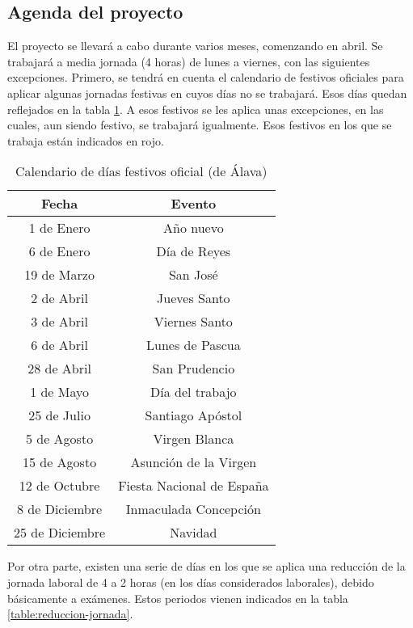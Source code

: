 \subsection{Agenda del proyecto}
El proyecto se llevará a cabo durante varios meses, comenzando en abril. Se trabajará a media jornada (4 horas) de lunes a viernes, con las siguientes excepciones. Primero, se tendrá en cuenta el calendario de festivos oficiales para aplicar algunas jornadas festivas en cuyos días no se trabajará. Esos días quedan reflejados en la tabla \ref{table:festivos-oficiales}. A esos festivos se les aplica unas excepciones, en las cuales, aun siendo festivo, se trabajará igualmente. Esos festivos en los que se trabaja están indicados en rojo.

\begin{table}[H]
	\centering
	\begin{tabular}{ |c|c| } 
		\hline
		Fecha & Evento \\
		\hline
		1 de Enero & Año nuevo \\
		6 de Enero & Día de Reyes \\
		19 de Marzo & San José \\
		{\color{red} 2 de Abril} & {\color{red} Jueves Santo }\\
		{\color{red} 3 de Abril} & {\color{red} Viernes Santo }\\
		{\color{red} 6 de Abril} & {\color{red} Lunes de Pascua }\\
		28 de Abril & San Prudencio \\
		1 de Mayo & Día del trabajo \\
		{\color{red}25 de Julio} & {\color{red}Santiago Apóstol } \\
		5 de Agosto & Virgen Blanca \\
		15 de Agosto & Asunción de la Virgen \\
		12 de Octubre & Fiesta Nacional de España \\
		8 de Diciembre & Inmaculada Concepción \\
		25 de Diciembre & Navidad \\
		\hline
	\end{tabular}
	\caption{Calendario de días festivos oficial (de Álava)}
	\label{table:festivos-oficiales}
\end{table}

Por otra parte, existen una serie de días en los que se aplica una reducción de la jornada laboral de 4 a 2 horas (en los días considerados laborales), debido básicamente a exámenes. Estos periodos vienen indicados en la tabla \ref{table:reduccion-jornada}.

